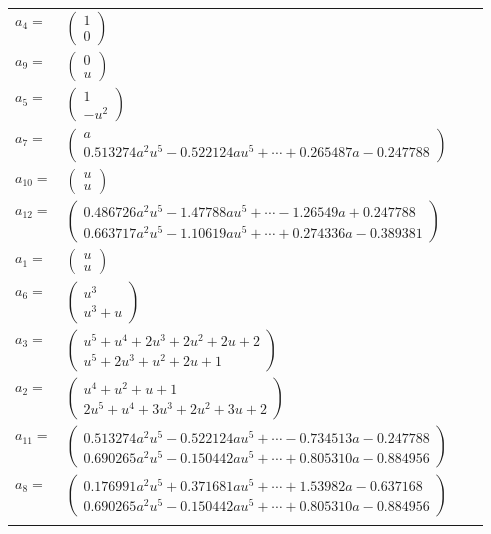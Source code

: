 \documentclass[1p]{elsarticle_modified}
\theoremstyle{definition}
\begin{document}
\begin{tabular}{m{7pt} m{180pt} m{7pt} m{180pt} }
\flushright $a_{4}=$&$\begin{pmatrix}1\\0\end{pmatrix}$ \\
\flushright $a_{9}=$&$\begin{pmatrix}0\\u\end{pmatrix}$ \\
\flushright $a_{5}=$&$\begin{pmatrix}1\\- u^2\end{pmatrix}$ \\
\flushright $a_{7}=$&$\begin{pmatrix}a\\0.513274 a^{2} u^{5}-0.522124 a u^{5}+\cdots+0.265487 a-0.247788\end{pmatrix}$ \\
\flushright $a_{10}=$&$\begin{pmatrix}u\\u\end{pmatrix}$ \\
\flushright $a_{12}=$&$\begin{pmatrix}0.486726 a^{2} u^{5}-1.47788 a u^{5}+\cdots-1.26549 a+0.247788\\0.663717 a^{2} u^{5}-1.10619 a u^{5}+\cdots+0.274336 a-0.389381\end{pmatrix}$ \\
\flushright $a_{1}=$&$\begin{pmatrix}u\\u\end{pmatrix}$ \\
\flushright $a_{6}=$&$\begin{pmatrix}u^3\\u^3+u\end{pmatrix}$ \\
\flushright $a_{3}=$&$\begin{pmatrix}u^5+u^4+2 u^3+2 u^2+2 u+2\\u^5+2 u^3+u^2+2 u+1\end{pmatrix}$ \\
\flushright $a_{2}=$&$\begin{pmatrix}u^4+u^2+u+1\\2 u^5+u^4+3 u^3+2 u^2+3 u+2\end{pmatrix}$ \\
\flushright $a_{11}=$&$\begin{pmatrix}0.513274 a^{2} u^{5}-0.522124 a u^{5}+\cdots-0.734513 a-0.247788\\0.690265 a^{2} u^{5}-0.150442 a u^{5}+\cdots+0.805310 a-0.884956\end{pmatrix}$ \\
\flushright $a_{8}=$&$\begin{pmatrix}0.176991 a^{2} u^{5}+0.371681 a u^{5}+\cdots+1.53982 a-0.637168\\0.690265 a^{2} u^{5}-0.150442 a u^{5}+\cdots+0.805310 a-0.884956\end{pmatrix}$\\&\end{tabular}
\end{document}
